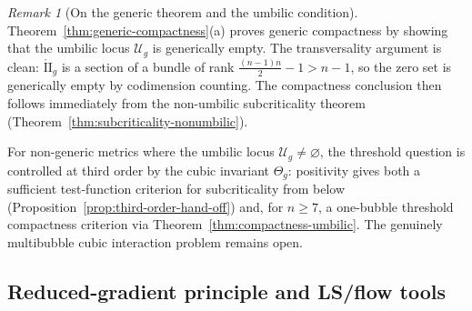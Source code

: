 \documentclass[11pt,reqno,a4paper]{amsart}
\numberwithin{equation}{section}
\theoremstyle{plain}
\theoremstyle{remark}
\newtheorem{remark}[theorem]{Remark}
\theoremstyle{plain}
\begin{document}
\begin{remark}[On the generic theorem and the umbilic condition]
\label{rem:mass-sign-density}
Theorem~\ref{thm:generic-compactness}\textup{(a)} proves generic compactness
by showing that the umbilic locus $\mathcal U_g$ is generically empty.
The transversality argument is clean:
$\mathring{\mathrm{II}}_g$ is a section of a bundle of rank $\frac{(n-1)n}{2}-1>n-1$,
so the zero set is generically empty by codimension counting.
The compactness conclusion then follows immediately from the
non-umbilic subcriticality theorem (Theorem~\ref{thm:subcriticality-nonumbilic}).

For non-generic metrics where the umbilic locus $\mathcal U_g\neq\varnothing$,
the threshold question is controlled at third order by the cubic invariant
$\Theta_g$: positivity gives both a sufficient test-function criterion for
subcriticality from below (Proposition~\ref{prop:third-order-hand-off}) and,
for $n\ge7$, a one-bubble threshold compactness criterion via
Theorem~\ref{thm:compactness-umbilic}. The genuinely multibubble cubic interaction
problem remains open.
\end{remark}


\subsection{Reduced-gradient principle and LS/flow tools}
\end{document}
